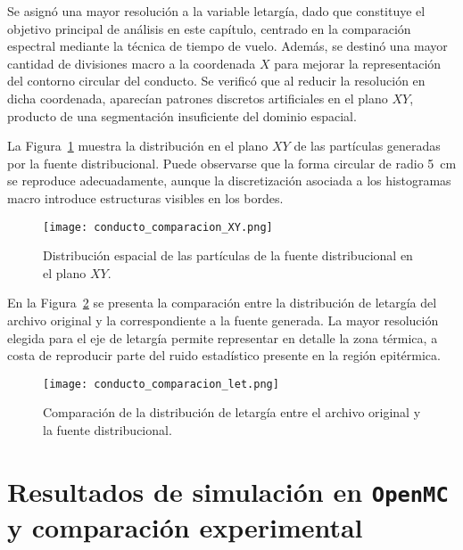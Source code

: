 Se asignó una mayor resolución a la variable letargía, dado que constituye el objetivo principal de análisis en este capítulo, centrado en la comparación espectral mediante la técnica de tiempo de vuelo. Además, se destinó una mayor cantidad de divisiones macro a la coordenada $X$ para mejorar la representación del contorno circular del conducto. Se verificó que al reducir la resolución en dicha coordenada, aparecían patrones discretos artificiales en el plano $XY$, producto de una segmentación insuficiente del dominio espacial.

La Figura~\ref{fig:conducto-comparacion-XY} muestra la distribución en el plano $XY$ de las partículas generadas por la fuente distribucional. Puede observarse que la forma circular de radio 5~cm se reproduce adecuadamente, aunque la discretización asociada a los histogramas macro introduce estructuras visibles en los bordes.

\begin{figure}[h]
\centering
\texttt{[image: conducto\_comparacion\_XY.png]}
\caption{Distribución espacial de las partículas de la fuente distribucional en el plano $XY$.}
\label{fig:conducto-comparacion-XY}
\end{figure}

En la Figura~\ref{fig:conducto-comparacion-let} se presenta la comparación entre la distribución de letargía del archivo original y la correspondiente a la fuente generada. La mayor resolución elegida para el eje de letargía permite representar en detalle la zona térmica, a costa de reproducir parte del ruido estadístico presente en la región epitérmica.

\begin{figure}[h]
\centering
\texttt{[image: conducto\_comparacion\_let.png]}
\caption{Comparación de la distribución de letargía entre el archivo original y la fuente distribucional.}
\label{fig:conducto-comparacion-let}
\end{figure}


\section{Resultados de simulación en \texttt{OpenMC} y comparación experimental}


